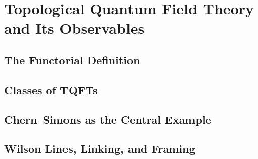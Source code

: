 \section{Topological Quantum Field Theory and Its Observables}
\label{sec:tqft-observables}


\subsection{The Functorial Definition}
\label{subsec:functorial-definition}


\subsection{Classes of TQFTs}
\label{subsec:tqft-classes}


\subsection{Chern--Simons as the Central Example}
\label{subsec:cs-central-example}


\subsection{Wilson Lines, Linking, and Framing}
\label{subsec:wilson-linking-framing}

